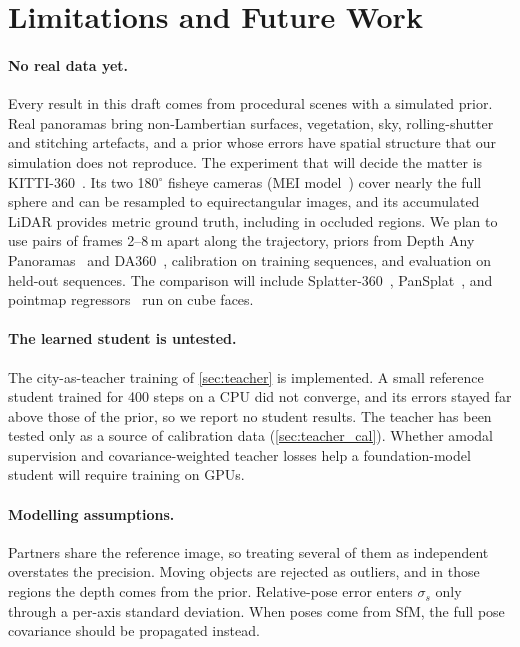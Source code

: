 \section{Limitations and Future Work}
\label{sec:limitations}

\paragraph{No real data yet.}
Every result in this draft comes from procedural scenes with a simulated prior. Real panoramas bring
non-Lambertian surfaces, vegetation, sky, rolling-shutter and stitching artefacts, and a prior whose
errors have spatial structure that our simulation does not reproduce. The experiment that will decide
the matter is KITTI-360~\cite{liao2022kitti360}. Its two 180$^\circ$ fisheye cameras (MEI
model~\cite{mei2007single}) cover nearly the full sphere and can be resampled to equirectangular
images, and its accumulated LiDAR provides metric ground truth, including in occluded regions. We plan
to use pairs of frames 2--8\,m apart along the trajectory, priors from Depth Any
Panoramas~\cite{lin2026dap} and DA360~\cite{da360}, calibration on training sequences, and evaluation
on held-out sequences. The comparison will include Splatter-360~\cite{chen2025splatter360},
PanSplat~\cite{zhang2024pansplat}, and pointmap regressors~\cite{leroy2024mast3r,wang2025vggt} run on
cube faces.

\paragraph{The learned student is untested.}
The city-as-teacher training of \cref{sec:teacher} is implemented. A small reference student trained
for 400 steps on a CPU did not converge, and its errors stayed far above those of the prior, so we
report no student results. The teacher has been tested only as a source of calibration data
(\cref{sec:teacher_cal}). Whether amodal supervision and covariance-weighted teacher losses help a
foundation-model student will require training on GPUs.

\paragraph{Modelling assumptions.}
Partners share the reference image, so treating several of them as independent overstates the
precision. Moving objects are rejected as outliers, and in those regions the depth comes from the
prior. Relative-pose error enters $\sigma_s$ only through a per-axis standard deviation. When poses
come from SfM, the full pose covariance should be propagated instead.

